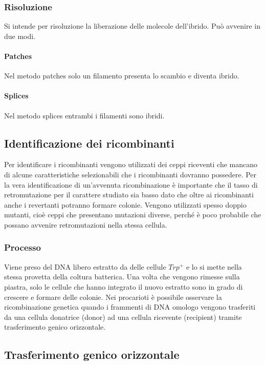 		\subsubsection{Risoluzione}
		Si intende per risoluzione la liberazione delle molecole dell'ibrido.
		Pu\`o avvenire in due modi.
			
			\paragraph{Patches}
			Nel metodo patches solo un filamento presenta lo scambio e diventa ibrido.

			\paragraph{Splices}
			Nel metodo splices entrambi i filamenti sono ibridi.

	\subsection{Identificazione dei ricombinanti}
	Per identificare i ricombinanti vengono utilizzati dei ceppi riceventi che mancano di alcune caratteristiche selezionabili che i ricombinanti dovranno possedere. 
	Per la vera identificazione di un'avvenuta ricombinazione è importante che il tasso di retromutazione per il carattere studiato sia basso dato che oltre ai ricombinanti anche i revertanti potranno formare colonie. 
	Vengono utilizzati spesso doppio mutanti, cioè ceppi che presentano mutazioni diverse, perché è poco probabile che possano avvenire retromutazioni nella stessa cellula. 

		\subsubsection{Processo}
		Viene preso del DNA libero estratto da delle cellule \emph{$Trp^{+}$} e lo si mette nella stessa provetta della coltura batterica. 
		Una volta che vengono rimesse sulla piastra, solo le cellule che hanno integrato il nuovo estratto sono in grado di crescere e formare delle colonie.
		Nei procarioti è possibile osservare la ricombinazione genetica quando i frammenti di DNA omologo vengono trasferiti da una cellula donatrice (donor) ad una cellula ricevente (recipient) tramite trasferimento genico orizzontale.

	\subsection{Trasferimento genico orizzontale}

